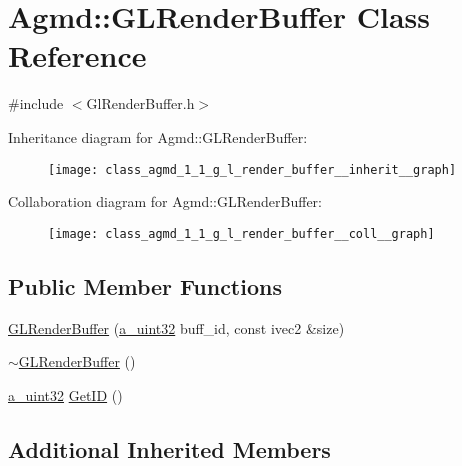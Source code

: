 \hypertarget{class_agmd_1_1_g_l_render_buffer}{\section{Agmd\+:\+:G\+L\+Render\+Buffer Class Reference}
\label{class_agmd_1_1_g_l_render_buffer}
}


{\ttfamily \#include $<$Gl\+Render\+Buffer.\+h$>$}



Inheritance diagram for Agmd\+:\+:G\+L\+Render\+Buffer\+:\nopagebreak
\begin{figure}[H]
\begin{center}
\leavevmode
\texttt{[image: class\_agmd\_1\_1\_g\_l\_render\_buffer\_\_inherit\_\_graph]}
\end{center}
\end{figure}


Collaboration diagram for Agmd\+:\+:G\+L\+Render\+Buffer\+:\nopagebreak
\begin{figure}[H]
\begin{center}
\leavevmode
\texttt{[image: class\_agmd\_1\_1\_g\_l\_render\_buffer\_\_coll\_\_graph]}
\end{center}
\end{figure}
\subsection*{Public Member Functions}
\begin{DoxyCompactItemize}
\item 
\hyperlink{class_agmd_1_1_g_l_render_buffer_ad889b8d7dbfc3993617319f5038cb61f}{G\+L\+Render\+Buffer} (\hyperlink{_common_defines_8h_a964296f9770051b9e4807b1f180dd416}{a\+\_\+uint32} buff\+\_\+id, const ivec2 \&size)
\item 
\hyperlink{class_agmd_1_1_g_l_render_buffer_afc90b353354f7244a5eae43726d0cede}{$\sim$\+G\+L\+Render\+Buffer} ()
\item 
\hyperlink{_common_defines_8h_a964296f9770051b9e4807b1f180dd416}{a\+\_\+uint32} \hyperlink{class_agmd_1_1_g_l_render_buffer_a78f1f2fcffba0ab540f4ec27db53cb86}{Get\+I\+D} ()
\end{DoxyCompactItemize}
\subsection*{Additional Inherited Members}


